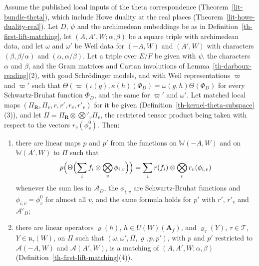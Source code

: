 \begin{lemma}\label{th-assemble-matching}
Assume the published local inputs of the theta correspondence
(Theorem~\ref{lit-bundle-theta}), which include Howe duality at the real places
(Theorem~\ref{lit-howe-duality-real}). Let $D$, $\psi$ and the archimedean
embeddings be as in Definition~\ref{th-first-lift-matching}, let
$(A,A',W;\alpha,\beta)$ be a square triple with archimedean data, and let
$\omega$ and $\omega'$ be Weil data for $(-A,W)$ and $(A',W)$ with characters
$(\beta,\beta/\alpha)$ and $(\alpha,\alpha/\beta)$. Let a triple over $E/F$ be
given with $\psi$, the characters $\alpha$ and $\beta$, and the Gram matrices
and Cartan involutions of Lemma~\ref{th-darboux-reading}(2), with good
Schrödinger models, and with Weil representations $\varpi$ and $\varpi'$ such
that $\Theta(\varpi(\iota(g),\kappa(h))\Phi_D)=\omega(g,h)\Theta(\Phi_D)$ for
every Schwartz-Bruhat function $\Phi_D$, and the same for $\varpi'$ and
$\omega'$. Let matched local maps $(\Pi_{\mathbf R},\Pi_v,r,r',r_v,r'_v)$ for
it be given (Definition~\ref{th-kernel-theta-subspace}(3)), and let
$\Pi=\Pi_{\mathbf R}\otimes\bigotimes'_v\Pi_v$, the restricted tensor product
being taken with respect to the vectors $r_v(\phi^0_v)$. Then:
\begin{enumerate}
\item there are linear maps $p$ and $p'$ from the functions on
  $\mathbb W(-A,W)$ and on $\mathbb W(A',W)$ to $\Pi$ such that
  \[
  p\Bigl(\Theta\Bigl(\sum_if_i\otimes\bigotimes_v\phi_{i,v}\Bigr)\Bigr)
  =\sum_ir(f_i)\otimes\bigotimes_vr_v(\phi_{i,v})
  \]
  whenever the sum lies in $\mathcal A_D$, the $\phi_{i,v}$ are
  Schwartz-Bruhat functions and $\phi_{i,v}=\phi^0_v$ for almost all $v$, and
  the same formula holds for $p'$ with $r'$, $r'_v$ and $\mathcal A'_D$;
\item there are linear operators $\varrho(h)$, $h\in U(W)(\mathbf A_f)$, and
  $\varrho_\tau(Y)$, $\tau\in\mathcal T$, $Y\in\mathfrak u_\tau(W)$, on $\Pi$
  such that $(\omega,\omega',\Pi,\varrho,p,p')$, with $p$ and $p'$ restricted to
  $\mathcal A(-A,W)$ and $\mathcal A(A',W)$, is a matching of
  $(A,A',W;\alpha,\beta)$ (Definition~\ref{th-first-lift-matching}(4)).
\end{enumerate}
\end{lemma}
